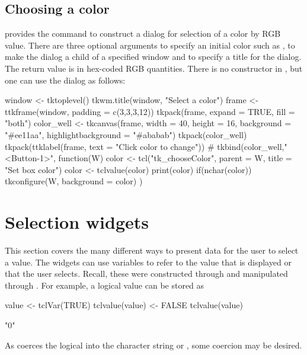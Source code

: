 \subsection{Choosing a color}
\Tk\/ provides the command  to construct a dialog for selection of a color by RGB value. There are three optional arguments  to specify an initial color such as ,  to make the dialog a child of a specified window and  to specify a title for the dialog. The return value is in hex-coded RGB quantities. 
There is no constructor in , but one can use the dialog as follows:
\begin{Schunk}
\begin{Sinput}
 window <- tktoplevel()
 tkwm.title(window, "Select a color")
 frame <- ttkframe(window, padding = c(3,3,3,12))
 tkpack(frame, expand = TRUE, fill = "both")
 color_well <- tkcanvas(frame, width = 40, height = 16, 
                       background = "#ee11aa",
                       highlightbackground = "#ababab") 
 tkpack(color_well)
 tkpack(ttklabel(frame, text = "Click color to change"))
 #
 tkbind(color_well,"<Button-1>", function(W) {
   color <- tcl("tk_chooseColor", parent = W, 
                title = "Set box color")
   color <- tclvalue(color)
   print(color)
   if(nchar(color))
     tkconfigure(W, background = color)
 })
\end{Sinput}
\end{Schunk}



\section{Selection widgets}
\label{sec:tcltk:selection-widgets}

This section covers the many different ways to present data for the
user to select a value. The widgets can use \TCL\/ variables to refer
to the value that is displayed or that the user selects.  Recall,
these were constructed through  and manipulated
through .  For example, a logical value can be stored as
\begin{Schunk}
\begin{Sinput}
 value <- tclVar(TRUE)
 tclvalue(value) <- FALSE
 tclvalue(value)
\end{Sinput}
\begin{Soutput}
[1] "0"
\end{Soutput}
\end{Schunk}
As  coerces the logical into the  character string   or , some coercion may be desired.



